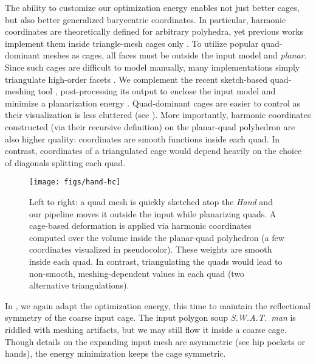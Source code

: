 The ability to customize our optimization energy enables not just better cages,
but also better generalized barycentric coordinates. In particular, harmonic
coordinates are theoretically defined for arbitrary polyhedra, yet previous
works implement them inside triangle-mesh cages only
\cite{HarmonicCoodinates07}.
%
To utilize popular quad-dominant meshes as cages, all faces must be outside the
input model and \emph{planar}.
%
Since such cages are difficult to model manually, many implementations simply
triangulate high-order facets \cite{HarmonicCoodinates07}.
%
We complement the recent sketch-based quad-meshing tool \cite{Takayama:2013},
post-processing its output to enclose the input model and minimize a
planarization energy \cite{poranne2013interactive}.
%
Quad-dominant cages are easier to control as their visualization is less
cluttered (see ).
%
More importantly, harmonic coordinates constructed (via their recursive
definition) on the planar-quad polyhedron are also higher quality: coordinates
are smooth functions inside each quad.
%
In contrast, coordinates of a triangulated cage would depend heavily on the
choice of diagonals splitting each quad.

\begin{figure}
  \texttt{[image: figs/hand-hc]}
  \caption{Left to right: a quad mesh is quickly sketched atop the \emph{Hand}
  and our pipeline moves it outside the input while planarizing quads. A
  cage-based deformation is applied via harmonic coordinates computed over the
  volume inside the planar-quad polyhedron (a few coordinates visualized in
  pseudocolor). These weights are smooth inside each quad. In contrast,
  triangulating the quads would lead to non-smooth, meshing-dependent values in
  each quad (two alternative triangulations).}
  \label{fig:hand-hc}
\end{figure}

In , we again adapt the optimization energy, this time to
maintain the reflectional symmetry of the coarse input cage.
%
The input polygon soup \emph{S.W.A.T.\ man} is riddled with meshing artifacts,
but we may still flow it inside a coarse cage.
%
Though details on the expanding input mesh are asymmetric (see hip pockets or
hands), the energy minimization keeps the cage symmetric.


